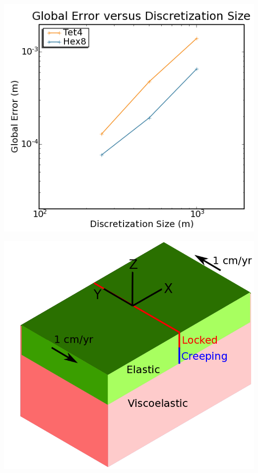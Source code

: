 \documentclass[pdftex,cig,slideColor]{pp4slides}
\begin{document}


  \vfill
 \begin{center}
    \includegraphics[scale=0.8]{figs/strikeslipnog_convergence}
  \end{center}
  \vfill


  \summary{}


  \vfill
  \begin{center}
    \includegraphics[scale=0.6]{figs/savageprescott_geometry}
  \end{center}
  \vfill
\end{document}
